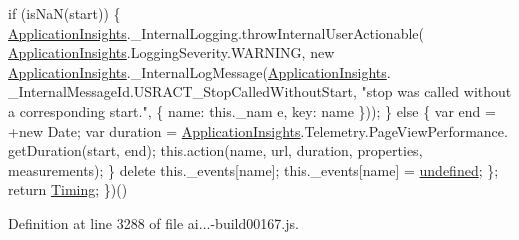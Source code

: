 \begin{DoxyCode}
                \textcolor{keywordflow}{if} (isNaN(start)) \{
                    \hyperlink{obj_2_release_2_package_2_package_tmp_2_scripts_2ai_80_822_89-build00167_8js_aa415ef4f8cdd699689ef4b61db7656d8}{ApplicationInsights}.\_InternalLogging.throwInternalUserActionable(
      \hyperlink{obj_2_release_2_package_2_package_tmp_2_scripts_2ai_80_822_89-build00167_8js_aa415ef4f8cdd699689ef4b61db7656d8}{ApplicationInsights}.LoggingSeverity.WARNING, \textcolor{keyword}{new} 
      \hyperlink{obj_2_release_2_package_2_package_tmp_2_scripts_2ai_80_822_89-build00167_8js_aa415ef4f8cdd699689ef4b61db7656d8}{ApplicationInsights}.\_InternalLogMessage(\hyperlink{obj_2_release_2_package_2_package_tmp_2_scripts_2ai_80_822_89-build00167_8js_aa415ef4f8cdd699689ef4b61db7656d8}{ApplicationInsights}.
      \_InternalMessageId.USRACT\_StopCalledWithoutStart, \textcolor{stringliteral}{"stop was called without a corresponding start."}, \{ name: this.\_nam
      e, key: name \}));
                \}
                \textcolor{keywordflow}{else} \{
                    var end = +\textcolor{keyword}{new} Date;
                    var duration = \hyperlink{obj_2_release_2_package_2_package_tmp_2_scripts_2ai_80_822_89-build00167_8js_aa415ef4f8cdd699689ef4b61db7656d8}{ApplicationInsights}.Telemetry.PageViewPerformance.
      getDuration(start, end);
                    this.action(name, url, duration, properties, measurements);
                \}
                \textcolor{keyword}{delete} this.\_events[name];
                this.\_events[name] = \hyperlink{obj_2_release_2_package_2_package_tmp_2_scripts_2jquery-1_810_82_8js_a08113a236cc18d2a9d5ce27e638012be}{undefined};
            \};
            \textcolor{keywordflow}{return} \hyperlink{obj_2_release_2_package_2_package_tmp_2_scripts_2ai_80_822_89-build00167_8js_afdd3ea2c773e0e94771da9013e155095}{Timing};
        \})()
\end{DoxyCode}


Definition at line 3288 of file ai...-\/build00167.\+js.


